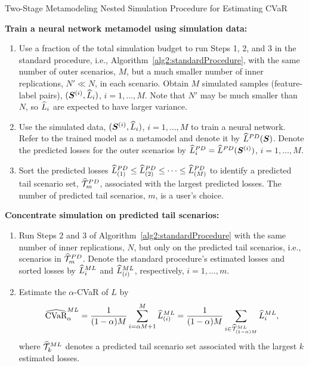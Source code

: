 \begin{algorithm}
\caption{Two-Stage Metamodeling Nested Simulation Procedure for Estimating CVaR}
\begin{algorithmic}[1] \label{alg2:twoStageProcedure}
    \STATE \textbf{Train a neural network metamodel using simulation data:}
    \begin{enumerate} [label=\alph*., itemsep=0pt, parsep=0pt, topsep=0pt]
        \item Use a fraction of the total simulation budget to run Steps 1, 2, and 3 in the standard procedure, i.e., Algorithm~\ref{alg2:standardProcedure}, with the same number of outer scenarios, $M$, but a much smaller number of inner replications, $N' \ll N$, in each scenario. Obtain $M$ simulated samples (feature-label pairs), $(\bm{S}^{(i)}, \widehat{L}_i)$, $i=1,\ldots,M$. Note that $N'$ may be much smaller than $N$, so $\widehat{L}_i$ are expected to have larger variance.
        \item Use the simulated data, $(\bm{S}^{(i)}, \widehat{L}_i)$, $i=1,\ldots,M$ to train a neural network. Refer to the trained model as a metamodel and denote it by $\widehat{L}^{PD}(\bm{S})$. Denote the predicted losses for the outer scenarios by $\widehat{L}^{PD}_i = \widehat{L}^{PD}(\bm{S}^{(i)})$, $i=1,\ldots,M$.
        \item Sort the predicted losses $\widehat{L}^{PD}_{(1)}\leq \widehat{L}^{PD}_{(2)} \leq \cdots\leq \widehat{L}^{PD}_{(M)}$ to identify a predicted tail scenario set, $\widehat{\mathcal{T}}_{m}^{PD}$, associated with the largest predicted losses. The number of predicted tail scenarios, $m$, is a user's choice.
    \end{enumerate}
    \STATE \textbf{Concentrate simulation on predicted tail scenarios:}
    \begin{enumerate} [label=\alph*., itemsep=0pt, parsep=0pt, topsep=0pt]
        \item Run Steps 2 and 3 of Algorithm~\ref{alg2:standardProcedure} with the same number of inner replications, $N$, but only on the predicted tail scenarios, i.e., scenarios in $\widehat{\mathcal{T}}_{m}^{PD}$. Denote the standard procedure's estimated losses and sorted losses by $\widehat{L}^{ML}_i$ and $\widehat{L}^{ML}_{(i)}$, respectively, $i=1,\ldots,m$.
        \item Estimate the $\alpha$-CVaR of $L$ by 
        $$\widehat{\mbox{CVaR}}^{ML}_\alpha = \frac{1}{(1-\alpha)M} \sum_{i=\alpha M + 1}^{M}\widehat{L}_{(i)}^{ML} = \frac{1}{(1-\alpha)M} \sum_{i \in \widehat{\mathcal{T}}_{(1-\alpha )M}^{ML}}\widehat{L}_{i}^{ML},$$ 
        where $\widehat{\mathcal{T}}_{k}^{ML}$ denotes a predicted tail scenario set associated with the largest $k$ estimated losses.
    \end{enumerate}
\end{algorithmic}
\end{algorithm}

